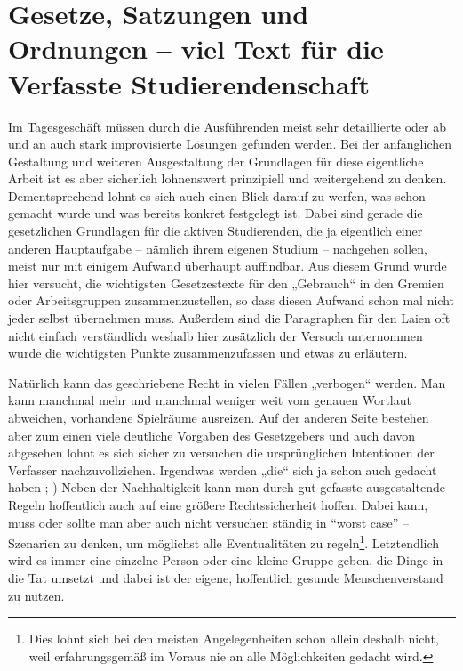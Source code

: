 \documentclass[
10pt,
a4paper,
twoside,								%
titlepage=false,							%
draft=false								%
]{scrartcl}
\begin{document}
\newpage
\vspace*{0.5cm}
\thispagestyle{empty}

\section*{Gesetze, Satzungen und Ordnungen – viel Text für die Verfasste Studierendenschaft}

Im Tagesgeschäft müssen durch die Ausführenden meist sehr detaillierte oder ab und an auch stark improvisierte Lösungen gefunden werden. Bei der anfänglichen Gestaltung und weiteren Ausgestaltung der Grundlagen für diese eigentliche Arbeit ist es aber sicherlich lohnenswert prinzipiell und weitergehend zu denken. Dementsprechend lohnt es sich auch einen Blick darauf zu werfen, was schon gemacht wurde und was bereits konkret festgelegt ist. Dabei sind gerade die gesetzlichen Grundlagen für die aktiven Studierenden, die ja eigentlich einer anderen Hauptaufgabe – nämlich ihrem eigenen Studium – nachgehen sollen, meist nur mit einigem Aufwand überhaupt auffindbar. Aus diesem Grund wurde hier versucht, die wichtigsten Gesetzestexte für den „Gebrauch“ in den Gremien oder Arbeitsgruppen zusammenzustellen, so dass diesen Aufwand schon mal nicht jeder selbst übernehmen muss. Außerdem sind die Paragraphen für den Laien oft nicht einfach verständlich weshalb hier zusätzlich der Versuch unternommen wurde die wichtigsten Punkte zusammenzufassen und etwas zu erläutern.

Natürlich kann das geschriebene Recht in vielen Fällen „verbogen“ werden. Man kann manchmal mehr und manchmal weniger weit vom genauen Wortlaut abweichen, vorhandene Spielräume ausreizen. Auf der anderen Seite bestehen aber zum einen viele deutliche Vorgaben des Gesetzgebers und auch davon abgesehen lohnt es sich sicher zu versuchen die ursprünglichen Intentionen der Verfasser nachzuvollziehen. Irgendwas werden „die“ sich ja schon auch gedacht haben ;-) Neben der Nachhaltigkeit kann man durch gut gefasste ausgestaltende Regeln hoffentlich auch auf eine größere Rechtssicherheit hoffen. Dabei kann, muss oder sollte man aber auch nicht versuchen ständig in “worst case” – Szenarien zu denken, um möglichst alle Eventualitäten zu regeln\footnote{Dies lohnt sich bei den meisten Angelegenheiten schon allein deshalb nicht, weil erfahrungsgemäß im Voraus nie an alle Möglichkeiten gedacht wird.}. Letztendlich wird es immer eine einzelne Person oder eine kleine Gruppe geben, die Dinge in die Tat umsetzt und dabei ist der eigene, hoffentlich gesunde Menschenverstand zu nutzen.
\end{document}
